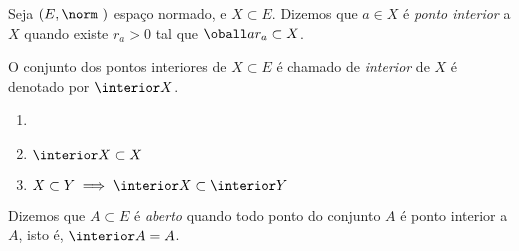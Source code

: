 \begin{definition}
	Seja $(E,\norm\ )$ espaço normado, e $X \subset E$. Dizemos que $a \in X$ é \emph{ponto interior}
	a $X$ quando existe $r_a > 0$ tal que $\oball a{r_a} \subset X$. 
\end{definition}

\begin{definition}
	O conjunto dos pontos interiores de $X \subset E$ é chamado de \emph{interior} de $X$
	é denotado por $\interior X$.
\end{definition}

\begin{fact}
	\begin{enumerate}
		\item[]
		\item $\interior X \subset X$
		\item $X \subset Y \implies \interior X \subset \interior Y$
	\end{enumerate}
\end{fact}

\begin{definition}
	Dizemos que $A \subset E$ é \emph{aberto} quando todo ponto do conjunto $A$
	é ponto interior a $A$, isto é, $\interior A = A$.
\end{definition}